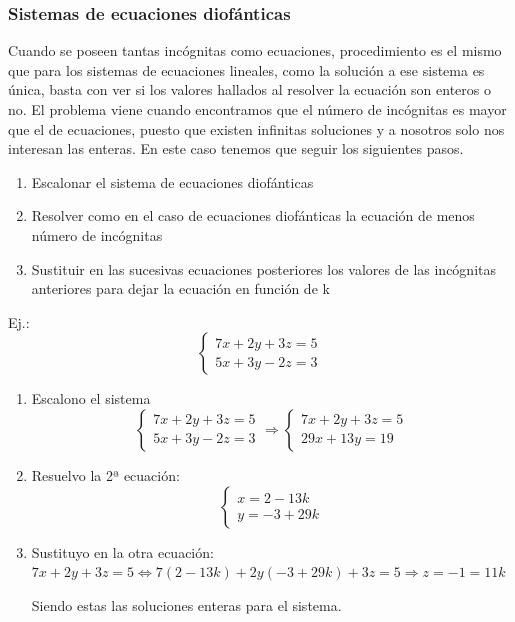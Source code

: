 \documentclass[10pt,a4paper,openright]{book}
\theoremstyle{break}
\begin{document}
\subsubsection*{Sistemas de ecuaciones diofánticas}
Cuando se poseen tantas incógnitas como ecuaciones, procedimiento es el mismo que para los sistemas de ecuaciones lineales, como la solución a ese sistema es única, basta con ver si los valores hallados al resolver la ecuación son enteros o no.
El problema viene cuando encontramos que el número de incógnitas es mayor que el de ecuaciones, puesto que existen infinitas soluciones y a nosotros solo nos interesan las enteras. En este caso tenemos que seguir los siguientes pasos.
\begin{enumerate}
\item Escalonar el sistema de ecuaciones diofánticas

\item Resolver como en el caso de ecuaciones diofánticas la ecuación de menos número de incógnitas

\item Sustituir en las sucesivas ecuaciones posteriores los valores de las incógnitas anteriores para dejar la ecuación en función de k
\end{enumerate}
Ej.:
$$
\begin{cases}
7x+2y+3z=5 \\
5x+3y-2z=3
\end{cases}
$$
\begin{enumerate}
\item Escalono el sistema
$$
\begin{cases}
7x+2y+3z=5 \\
5x+3y-2z=3
\end{cases}
\Rightarrow
\begin{cases}
7x+2y+3z=5 \\
29x+13y=19
\end{cases}
$$

\item Resuelvo la 2ª ecuación:
$$
\begin{cases}
x=2-13k \\
y=-3+29k
\end{cases}
$$

\item Sustituyo en la otra ecuación:
$7x+2y+3z=5\Leftrightarrow 7(2-13k)+2y(-3+29k)+3z=5\Rightarrow z=-1=11k$

Siendo estas las soluciones enteras para el sistema.
\end{enumerate}
\end{document}

